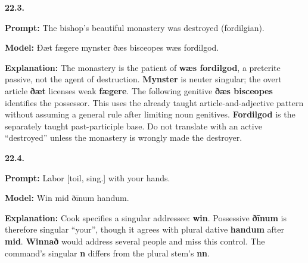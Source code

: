 \par\begin{minipage}{\linewidth}\raggedright
\textbf{22.3.}

\textbf{Prompt:} The bishop’s beautiful monastery was destroyed (fordilgian).

\textbf{Model:} Ðæt fægere mynster ðæs bisceopes wæs fordilgod.

\textbf{Explanation:} The monastery is the patient of \textbf{wæs fordilgod}, a preterite passive, not the agent of destruction. \textbf{Mynster} is neuter singular; the overt article \textbf{ðæt} licenses weak \textbf{fægere}. The following genitive \textbf{ðæs bisceopes} identifies the possessor. This uses the already taught article-and-adjective pattern without assuming a general rule after limiting noun genitives. \textbf{Fordilgod} is the separately taught past-participle base. Do not translate with an active “destroyed” unless the monastery is wrongly made the destroyer.

\end{minipage}\par\addvspace{4pt}

\par\begin{minipage}{\linewidth}\raggedright
\textbf{22.4.}

\textbf{Prompt:} Labor [toil, sing.] with your hands.

\textbf{Model:} Win mid ðīnum handum.

\textbf{Explanation:} Cook specifies a singular addressee: \textbf{win}. Possessive \textbf{ðīnum} is therefore singular “your”, though it agrees with plural dative \textbf{handum} after \textbf{mid}. \textbf{Winnað} would address several people and miss this control. The command’s singular \textbf{n} differs from the plural stem’s \textbf{nn}.

\end{minipage}\par\addvspace{4pt}

